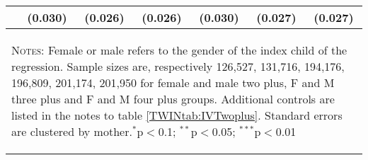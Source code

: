 \begin{table}[htpb!]
\begin{center}
\begin{tabular}{lcccccc}
&(0.030)&(0.026)&(0.026)&(0.030)&(0.027)&(0.027)\\
\midrule\multicolumn{7}{p{11.5cm}}{\begin{footnotesize}\textsc{Notes:} Female or male refers to the gender of the index child of the regression. 
Sample sizes are, respectively 126,527, 131,716, 194,176, 196,809, 201,174, 201,950 for female and male two plus, F and M 
three plus and F and M four plus groups.  Additional controls are listed in 
the notes to table \ref{TWINtab:IVTwoplus}.  Standard errors are clustered 
by mother.$^{*}$p$<$0.1; $^{**}$p$<$0.05; $^{***}$p$<$0.01
\end{footnotesize}} \\ \bottomrule 
\end{tabular}\end{center}\end{table}